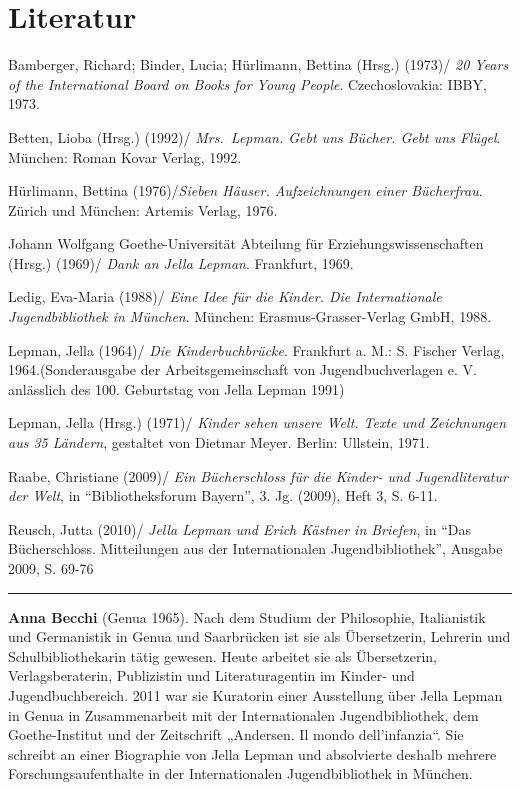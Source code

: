 \documentclass[a4paper,
fontsize=11pt,
oneside,
numbers=noperiodatend,
parskip=half-,
bibliography=totoc,
final
]{scrartcl}
\begin{document}
\section*{Literatur}\label{literatur}

Bamberger, Richard; Binder, Lucia; Hürlimann, Bettina (Hrsg.) (1973)/
\emph{20 Years of the International Board on Books for Young People}.
Czechoslovakia: IBBY, 1973.

Betten, Lioba (Hrsg.) (1992)/ \emph{Mrs.~Lepman. Gebt uns Bücher. Gebt
uns Flügel}. München: Roman Kovar Verlag, 1992.

Hürlimann, Bettina (1976)/\emph{Sieben Häuser. Aufzeichnungen einer
Bücherfrau}. Zürich und München: Artemis Verlag, 1976.

Johann Wolfgang Goethe-Universität Abteilung für
Erziehungswissenschaften (Hrsg.) (1969)/ \emph{Dank an Jella Lepman}.
Frankfurt, 1969.

Ledig, Eva-Maria (1988)/ \emph{Eine Idee für die Kinder. Die
Internationale Jugendbibliothek in München}. München:
Erasmus-Grasser-Verlag GmbH, 1988.

Lepman, Jella (1964)/ \emph{Die Kinderbuchbrücke}. Frankfurt a. M.: S.
Fischer Verlag, 1964.(Sonderausgabe der Arbeitsgemeinschaft von
Jugendbuchverlagen e. V. anlässlich des 100. Geburtstag von Jella Lepman
1991)

Lepman, Jella (Hrsg.) (1971)/ \emph{Kinder sehen unsere Welt. Texte und
Zeichnungen aus 35 Ländern}, gestaltet von Dietmar Meyer. Berlin:
Ullstein, 1971.

Raabe, Christiane (2009)/ \emph{Ein Bücherschloss für die Kinder- und
Jugendliteratur der Welt}, in \enquote{Bibliotheksforum Bayern}, 3. Jg.
(2009), Heft 3, S. 6-11.

Reusch, Jutta (2010)/ \emph{Jella Lepman und Erich Kästner in Briefen},
in \enquote{Das Bücherschloss. Mitteilungen aus der Internationalen
Jugendbibliothek}, Ausgabe 2009, S. 69-76

\begin{center}\rule{3in}{0.4pt}\end{center}

\textbf{Anna Becchi} (Genua 1965). Nach dem Studium der Philosophie,
Italianistik und Germanistik in Genua und Saarbrücken ist sie als
Übersetzerin, Lehrerin und Schulbibliothekarin tätig gewesen. Heute
arbeitet sie als Übersetzerin, Verlagsberaterin, Publizistin und
Literaturagentin im Kinder- und Jugendbuchbereich. 2011 war sie
Kuratorin einer Ausstellung über Jella Lepman in Genua in Zusammenarbeit
mit der Internationalen Jugendbibliothek, dem Goethe-Institut und der
Zeitschrift „Andersen. Il mondo dell'infanzia``. Sie schreibt an einer
Biographie von Jella Lepman und absolvierte deshalb mehrere
Forschungsaufenthalte in der Internationalen Jugendbibliothek in
München.
\end{document}
